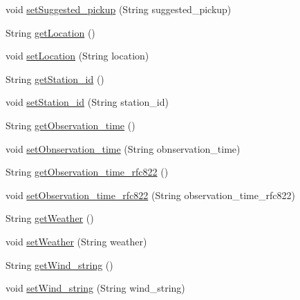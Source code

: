 \begin{DoxyCompactItemize}
\item 
void \hyperlink{classgov_1_1fnal_1_1ppd_1_1dd_1_1testing_1_1news_1_1current__observation_a9b72aa679853f7ffd59acff5eda0837b}{set\-Suggested\-\_\-pickup} (String suggested\-\_\-pickup)
\item 
String \hyperlink{classgov_1_1fnal_1_1ppd_1_1dd_1_1testing_1_1news_1_1current__observation_a0ca284c1e14fd635c0bcf9fc572e4bad}{get\-Location} ()
\item 
void \hyperlink{classgov_1_1fnal_1_1ppd_1_1dd_1_1testing_1_1news_1_1current__observation_acc70380f2e59a4681385f1afb04928ec}{set\-Location} (String location)
\item 
String \hyperlink{classgov_1_1fnal_1_1ppd_1_1dd_1_1testing_1_1news_1_1current__observation_a3ac1ccc33b3cd8684dacfc0dc1662302}{get\-Station\-\_\-id} ()
\item 
void \hyperlink{classgov_1_1fnal_1_1ppd_1_1dd_1_1testing_1_1news_1_1current__observation_a177811a49bf57a7a5349382baa781486}{set\-Station\-\_\-id} (String station\-\_\-id)
\item 
String \hyperlink{classgov_1_1fnal_1_1ppd_1_1dd_1_1testing_1_1news_1_1current__observation_ae8fe7d7442dd9594cacc938cee5c4be0}{get\-Observation\-\_\-time} ()
\item 
void \hyperlink{classgov_1_1fnal_1_1ppd_1_1dd_1_1testing_1_1news_1_1current__observation_a2ca26fd258476b0184289f6029d3155d}{set\-Obnservation\-\_\-time} (String obnservation\-\_\-time)
\item 
String \hyperlink{classgov_1_1fnal_1_1ppd_1_1dd_1_1testing_1_1news_1_1current__observation_a64bbaa56a032cd0c57ff9d0506ab8573}{get\-Observation\-\_\-time\-\_\-rfc822} ()
\item 
void \hyperlink{classgov_1_1fnal_1_1ppd_1_1dd_1_1testing_1_1news_1_1current__observation_af61702e3b2ca58c2a62463f3054306e0}{set\-Observation\-\_\-time\-\_\-rfc822} (String observation\-\_\-time\-\_\-rfc822)
\item 
String \hyperlink{classgov_1_1fnal_1_1ppd_1_1dd_1_1testing_1_1news_1_1current__observation_aef177cc9f6581e1dbf9468275a44453d}{get\-Weather} ()
\item 
void \hyperlink{classgov_1_1fnal_1_1ppd_1_1dd_1_1testing_1_1news_1_1current__observation_a7d9c7d0943e4c59597c4ede03554171b}{set\-Weather} (String weather)
\item 
String \hyperlink{classgov_1_1fnal_1_1ppd_1_1dd_1_1testing_1_1news_1_1current__observation_aae6906d90228b6c199d2e86bfa0fb5cd}{get\-Wind\-\_\-string} ()
\item 
void \hyperlink{classgov_1_1fnal_1_1ppd_1_1dd_1_1testing_1_1news_1_1current__observation_a2c8597a5345c1fff2acf446110291d50}{set\-Wind\-\_\-string} (String wind\-\_\-string)

\end{DoxyCompactItemize}
